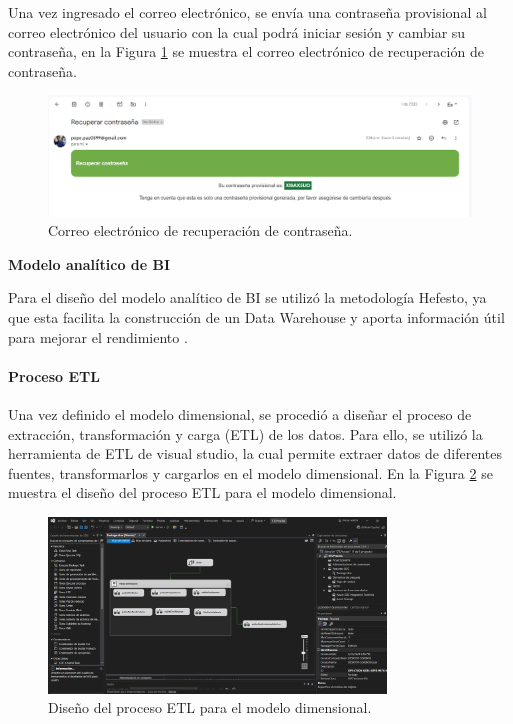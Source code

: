 Una vez ingresado el correo electrónico, se envía una contraseña provisional al correo electrónico del usuario con la cual
podrá iniciar sesión y cambiar su contraseña, en la Figura \ref{fig:recuperar-contrasena-email} se muestra el correo electrónico
de recuperación de contraseña.

\begin{figure}[H]
    \centering
    \includegraphics[width=1\textwidth]{chapters/III-resultados-y-discusion/resources/images/recuperar-contrasena-email.png}
    \caption{Correo electrónico de recuperación de contraseña.}
    \label{fig:recuperar-contrasena-email}
\end{figure}

\textbf{Modelo analítico de BI}
\bigbreak

Para el diseño del modelo analítico de BI se utilizó la metodología Hefesto, ya que esta facilita la construcción de un
Data Warehouse y aporta información útil para mejorar el rendimiento \cite{darioDATAWAREHOUSINGMarco2018}.



\paragraph{Proceso ETL}

Una vez definido el modelo dimensional, se procedió a diseñar el proceso de extracción, transformación y carga (ETL) de los datos.
Para ello, se utilizó la herramienta de ETL de visual studio, la cual permite extraer datos de diferentes fuentes, transformarlos
y cargarlos en el modelo dimensional. En la Figura \ref{fig:etl-bi} se muestra el diseño del proceso ETL para el modelo dimensional.

\begin{figure}[H]
    \centering
    \includegraphics[width=0.8\textwidth]{chapters/III-resultados-y-discusion/resources/images/etl-bi.png}
    \caption{Diseño del proceso ETL para el modelo dimensional.}
    \label{fig:etl-bi}
\end{figure}

